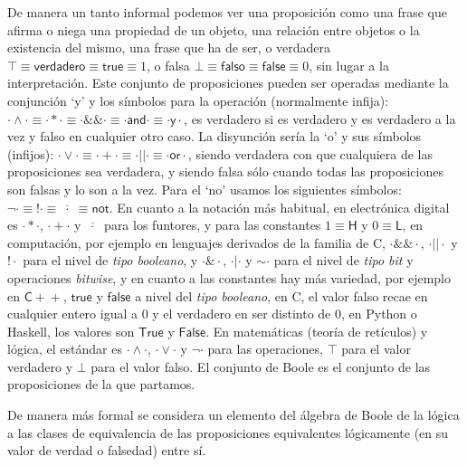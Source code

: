 \documentclass[final,12pt,a4paper,twoside,fleqn]{extbook}
\theoremstyle{definition}
\theoremstyle{remark}
\begin{document}
	De manera un tanto informal podemos ver una proposición como una frase
que afirma o niega una propiedad de un objeto, una relación entre objetos o
la existencia del mismo, una frase que ha de ser, o verdadera \(\top \equiv
\mathsf{verdadero} \equiv \mathsf{true} \equiv 1\), o falsa \(\bot \equiv
\mathsf{falso} \equiv \mathsf{false} \equiv 0\), sin lugar a la 
interpretación. Este conjunto de proposiciones pueden ser operadas mediante 
la conjunción ‘y’ y los símbolos para la operación (normalmente infija): \(
\cdot\wedge\cdot \equiv \cdot*\cdot \equiv \cdot\&\!\&\cdot 
\equiv \cdot\mathsf{and}\cdot \equiv \cdot\mathsf{y}\cdot \), es verdadero si
es verdadero y es verdadero a la vez y falso en cualquier otro caso. La
disyunción sería la ‘o’ y sus símbolos (infijos): \(\cdot \vee \cdot  \equiv 
\cdot + \cdot \equiv \cdot |\!| \cdot \equiv \cdot \mathsf{or} \cdot \), 
siendo verdadera con que cualquiera de las proposiciones sea verdadera, y 
siendo falsa sólo cuando todas las proposiciones son falsas y lo son a la 
vez.  Para el ‘no’ usamos los siguientes símbolos: \(\neg\cdot \equiv !\cdot 
\equiv \overline{\;\cdot\;}\equiv \mathsf{not} \). En cuanto a la notación 
más habitual, en electrónica digital es \(\cdot * \cdot\), \(\cdot+\cdot\) y 
\(\overline{\;\cdot\;}\) para los funtores, y para las constantes \(1\equiv 
\mathsf{H}\) y \(0 \equiv \mathsf{L}\), en computación, por ejemplo en 
lenguajes derivados de la familia de \textsf{C}, \(\cdot\&\!\&\cdot\), 
\(\cdot |\!|\cdot\) y \(!\cdot\) para el nivel de \emph{tipo booleano}, y  
\(\cdot\&\cdot\), \(\cdot |\cdot\) y \(\sim\cdot\) para el nivel de
\emph{tipo bit} y operaciones \emph{bitwise}, y en cuanto a las constantes
hay más variedad, por ejemplo en \(\textsf{C}\!+\!+\), \(\mathsf{true}\) y
\(\mathsf{false}\) a nivel del \emph{tipo booleano}, en \textsf{C}, el valor
falso recae en cualquier entero igual a \(0\) y el verdadero en ser distinto
de \(0\), en \textsf{Python} o \textsf{Haskell}, los valores son
\(\mathsf{True}\) y \(\mathsf{False}\). En matemáticas (teoría de retículos)
y lógica, el estándar es \(\cdot\wedge\cdot\), \(\cdot\vee\cdot\) y 
\(\neg\cdot\) para las operaciones, \(\top\) para el valor verdadero y 
\(\bot\) para el valor falso. El conjunto de Boole es el conjunto de las
proposiciones de la que partamos.



	De manera más formal se considera un elemento del álgebra de Boole de la
lógica a las clases de equivalencia de las proposiciones equivalentes
lógicamente (en su valor de verdad o falsedad) entre sí.
\end{document}
